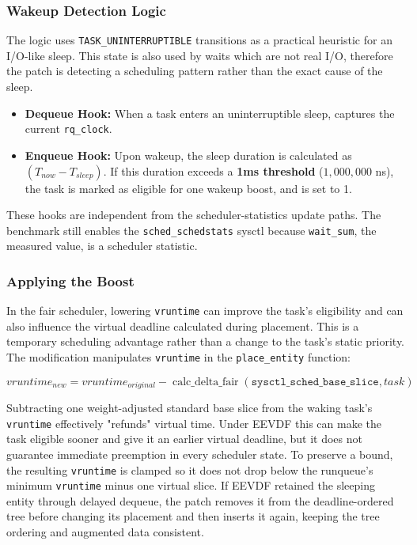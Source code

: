 \documentclass[11pt, a4paper]{article}
\begin{document}
\subsubsection{Wakeup Detection Logic}
The logic uses \texttt{TASK\_UNINTERRUPTIBLE} transitions as a practical heuristic for an I/O-like sleep. This state is also used by waits which are not real I/O, therefore the patch is detecting a scheduling pattern rather than the exact cause of the sleep.
\begin{itemize}
    \item \textbf{Dequeue Hook:} When a task enters an uninterruptible sleep,  captures the current \texttt{rq\_clock}.
    \item \textbf{Enqueue Hook:} Upon wakeup, the sleep duration is calculated as $(T_{now} - T_{sleep})$. If this duration exceeds a \textbf{1ms threshold} ($1,000,000$ ns), the task is marked as eligible for one wakeup boost, and  is set to 1.
\end{itemize}
These hooks are independent from the scheduler-statistics update paths. The benchmark still enables the \texttt{sched\_schedstats} sysctl because \texttt{wait\_sum}, the measured value, is a scheduler statistic.

\subsubsection{Applying the Boost}
In the fair scheduler, lowering \texttt{vruntime} can improve the task's eligibility and can also influence the virtual deadline calculated during placement. This is a temporary scheduling advantage rather than a change to the task's static priority. The modification manipulates \texttt{vruntime} in the \texttt{place\_entity} function:

\begin{equation}
    vruntime_{new} = vruntime_{original} - \operatorname{calc\_delta\_fair}(\texttt{sysctl\_sched\_base\_slice}, task)
\end{equation}

Subtracting one weight-adjusted standard base slice from the waking task's \texttt{vruntime} effectively "refunds" virtual time. Under EEVDF this can make the task eligible sooner and give it an earlier virtual deadline, but it does not guarantee immediate preemption in every scheduler state. To preserve a bound, the resulting \texttt{vruntime} is clamped so it does not drop below the runqueue's minimum \texttt{vruntime} minus one virtual slice. If EEVDF retained the sleeping entity through delayed dequeue, the patch removes it from the deadline-ordered tree before changing its placement and then inserts it again, keeping the tree ordering and augmented data consistent.
\end{document}
